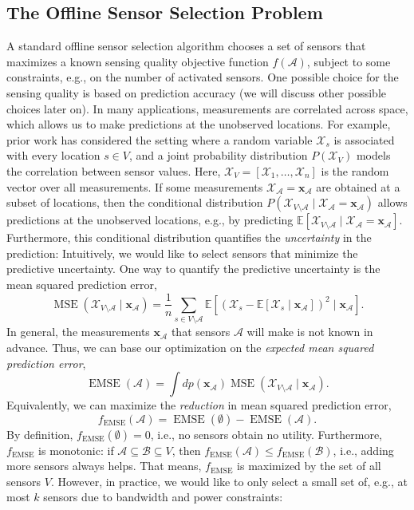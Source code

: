 \documentclass{sig-alternate-dan}
\numberwithin{equation}{section}
\DeclareMathOperator{\EMSE}{EMSE}
\DeclareMathOperator{\MSE}{MSE}
\newcommand{\fEMSE}{f_{\EMSE}}
\newcommand{\numsensors}{\ensuremath{n}}
\newcommand{\sensors}{V}
\newcommand{\cA}{{\mathcal{A}}}
\newcommand{\cB}{{\mathcal{B}}}
\newcommand{\cX}{{\mathcal{X}}}
\newcommand{\bx}{{\mathbf{x}}}
\begin{document}
\subsection{The Offline Sensor Selection Problem}
\label{sec:offline-problem}
A standard offline sensor selection algorithm chooses a set of sensors
that maximizes a known sensing quality objective function $f(\cA)$,
subject to some constraints,
%
%
%
e.g., on the number of activated sensors. One possible choice for the
sensing quality is based on prediction accuracy (we will discuss other
possible choices later on).  In many applications, measurements are
correlated across space, which allows us to make predictions at the
unobserved locations.  For example, prior work \cite{vldb04} has
considered the setting where a random variable $\cX_{s}$ is associated
with every location $s\in\sensors$, and a joint probability
distribution $P(\cX_{\sensors})$ models the correlation between sensor
values.  Here, $\cX_{\sensors}=[\cX_{1},\dots,\cX_{\numsensors}]$ is
the random vector over all measurements.  If some measurements
$\cX_{\cA}=\bx_{\cA}$ are obtained at a subset of locations, then the
conditional distribution
$P(\cX_{\sensors\setminus\cA}\mid\cX_{\cA}=\bx_{\cA})$ allows
predictions at the unobserved locations, e.g., by predicting
$\mathbb{E}[\cX_{\sensors\setminus\cA}\mid\cX_{\cA}=\bx_{\cA}]$.
Furthermore, this conditional distribution quantifies the
\emph{uncertainty} in the prediction: Intuitively, we would like to
select sensors that minimize the predictive uncertainty.  One way to
quantify the predictive uncertainty is the mean squared prediction
error,
$$\MSE(\cX_{\sensors\setminus\cA}\mid \bx_{\cA}) =
\frac{1}{\numsensors}\sum_{s\in\sensors\setminus\cA}
\mathbb{E}[(\cX_s-\mathbb{E}[\cX_{s}\mid\bx_{\cA}])^{2}\mid
\bx_{\cA}].$$ In general, the measurements $\bx_{\cA}$ that sensors
$\cA$ will make is not known in advance.  Thus, we can base our
optimization on the \emph{expected mean squared prediction error},
$$\EMSE(\cA) = \int dp(\bx_{\cA}) \MSE(\cX_{\sensors\setminus\cA}\mid \bx_{\cA}).$$
Equivalently, we can maximize the \emph{reduction} in mean squared prediction error,
$$\fEMSE(\cA) = \EMSE(\emptyset)-\EMSE(\cA).$$ By definition,
$\fEMSE(\emptyset)=0$, i.e., no sensors obtain no
utility. Furthermore, $\fEMSE$ is monotonic: if
$\cA\subseteq\cB\subseteq\sensors$, then $\fEMSE(\cA)\leq
\fEMSE(\cB)$, i.e., adding more sensors always helps.  That means,
$\fEMSE$ is maximized by the set of all sensors $\sensors$.  However,
in practice, we would like to only select a small set of, e.g., at
most $k$ sensors due to bandwidth and power constraints:
\end{document}
